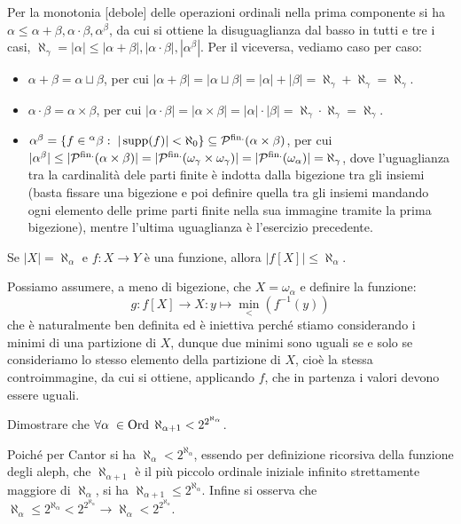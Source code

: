\begin{soln}
	Per la monotonia [debole] delle operazioni ordinali nella prima componente si ha $\alpha \leq \alpha + \beta, \alpha \cdot \beta, \alpha^\beta$, da cui si ottiene la disuguaglianza dal basso 
	in tutti e tre i casi, $\aleph_\gamma = |\alpha| \leq |\alpha + \beta|, |\alpha \cdot \beta|, |\alpha^\beta|$. Per il viceversa, vediamo caso per caso:
	\begin{itemize}
		\item $\alpha + \beta = \alpha \sqcup \beta$, per cui $|\alpha + \beta| = |\alpha \sqcup \beta| = |\alpha| + |\beta| = \aleph_\gamma + \aleph_\gamma = \aleph_\gamma$.
		\item $\alpha \cdot \beta = \alpha \times \beta$, per cui $|\alpha \cdot \beta| = |\alpha \times \beta| = |\alpha| \cdot |\beta| = \aleph_\gamma \cdot \aleph_\gamma = \aleph_\gamma$.
		\item $\alpha^\beta = \{f \in {}^\alpha\beta : \; |\operatorname{supp}(f)| < \aleph_0\} \subseteq \mathcal{P}^{\text{fin.}}(\alpha \times \beta)$, per cui $|\alpha^\beta| \leq |\mathcal{P}^{\text{fin.}}(\alpha \times \beta)| = |\mathcal{P}^{\text{fin.}}(\omega_\gamma \times \omega_\gamma)| = |\mathcal{P}^{\text{fin.}}(\omega_\alpha)| = \aleph_\gamma$,
		dove l'uguaglianza tra la cardinalit\`a dele parti finite \`e indotta dalla bigezione tra gli insiemi (basta fissare una bigezione e poi definire quella tra gli insiemi mandando ogni elemento delle prime parti finite nella sua immagine tramite la prima bigezione),
		mentre l'ultima uguaglianza \`e l'esercizio precedente.
	\end{itemize}
\end{soln}

\begin{exercise}
	Se $|X| = \aleph_\alpha$ e $f : X \to Y$ \`e una funzione, allora $|f[X]| \leq \aleph_\alpha$.
\end{exercise}

\begin{soln}
	Possiamo assumere, a meno di bigezione, che $X = \omega_\alpha$ e definire la funzione:
	\[ g : f[X] \to X : y \mapsto \min_<(f^{-1}(y))
		\]
	che \`e naturalmente ben definita ed \`e iniettiva perch\'e stiamo considerando i minimi di una partizione di $X$, dunque due minimi sono uguali se e solo se consideriamo lo stesso elemento della partizione di $X$, cio\`e la stessa controimmagine,
	da cui si ottiene, applicando $f$, che in partenza i valori devono essere uguali.
\end{soln}

\begin{exercise}
	Dimostrare che $\forall \alpha \; \in \operatorname{Ord} \; \aleph_{\alpha + 1} < 2^{2^{\aleph_\alpha}}$.
\end{exercise}

\begin{soln}
	Poich\'e per Cantor si ha $\aleph_\alpha < 2^{\aleph_\alpha}$, essendo per definizione ricorsiva della funzione degli aleph, che $\aleph_{\alpha + 1}$ \`e il pi\`u piccolo ordinale iniziale infinito strettamente maggiore di $\aleph_\alpha$, si ha $\aleph_{\alpha + 1} \leq 2^{\aleph_\alpha}$.
	Infine si osserva che $\aleph_{\alpha} \leq 2^{\aleph_\alpha} < 2^{2^{\aleph_\alpha}} \to \aleph_{\alpha} < 2^{2^{\aleph_\alpha}}$.
\end{soln}